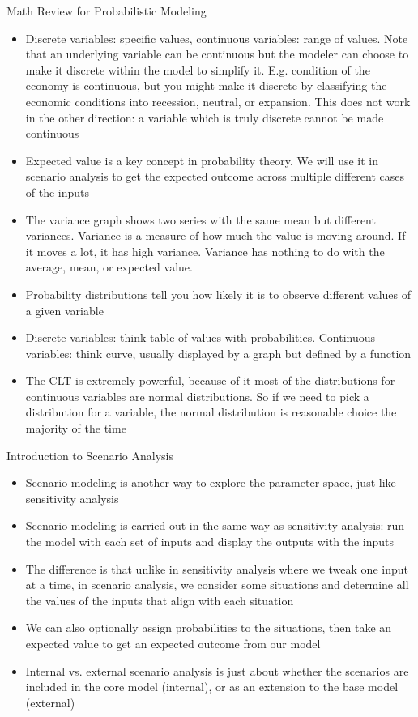 \documentclass[]{article}
\begin{document}
\begin{section}{Math Review for Probabilistic Modeling}
\begin{itemize}
\item Discrete variables: specific values, continuous variables: range of values. Note that an underlying variable can be continuous but the modeler can choose to make it discrete within the model to simplify it. E.g. condition of the economy is continuous, but you might make it discrete by classifying the economic conditions into recession, neutral, or expansion. This does not work in the other direction: a variable which is truly discrete cannot be made continuous
\item Expected value is a key concept in probability theory. We will use it in scenario analysis to get the expected outcome across multiple different cases of the inputs
\item The variance graph shows two series with the same mean but different variances. Variance is a measure of how much the value is moving around. If it moves a lot, it has high variance. Variance has nothing to do with the average, mean, or expected value.
\item Probability distributions tell you how likely it is to observe different values of a given variable
\item Discrete variables: think table of values with probabilities. Continuous variables: think curve, usually displayed by a graph but defined by a function
\item The CLT is extremely powerful, because of it most of the distributions for continuous variables are normal distributions. So if we need to pick a distribution for a variable, the normal distribution is reasonable choice the majority of the time
\end{itemize}
\end{section}
\begin{section}{Introduction to Scenario Analysis}
\begin{itemize}
\item Scenario modeling is another way to explore the parameter space, just like sensitivity analysis
\item Scenario modeling is carried out in the same way as sensitivity analysis: run the model with each set of inputs and display the outputs with the inputs
\item The difference is that unlike in sensitivity analysis where we tweak one input at a time, in scenario analysis, we consider some situations and determine all the values of the inputs that align with each situation
\item We can also optionally assign probabilities to the situations, then take an expected value to get an expected outcome from our model
\item Internal vs. external scenario analysis is just about whether the scenarios are included in the core model (internal), or as an extension to the base model (external)
\end{itemize}
\end{section}
\end{document}
